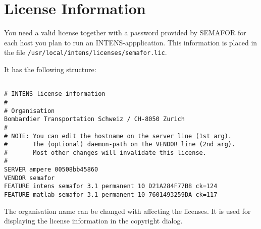 \section{License Information}
You need a valid license together with a password
provided by SEMAFOR for each
host you plan to run an INTENS-appplication. This information
is placed in the file \verb+/usr/local/intens/licenses/semafor.lic+.

It has the following structure:
\begin{boxedminipage}[t]{\linewidth}
\begin{verbatim}

# INTENS license information
#
# Organisation
Bombardier Transportation Schweiz / CH-8050 Zurich
#
# NOTE: You can edit the hostname on the server line (1st arg).
#       The (optional) daemon-path on the VENDOR line (2nd arg).
#       Most other changes will invalidate this license.
#
SERVER ampere 00508bb45860
VENDOR semafor
FEATURE intens semafor 3.1 permanent 10 D21A284F77B8 ck=124
FEATURE matlab semafor 3.1 permanent 10 7601493259DA ck=117
\end{verbatim}
\end{boxedminipage}

\vspace{1cm}

The organisation name can be changed with affecting the licenses.
It is used for displaying the license information in the copyright
dialog.
